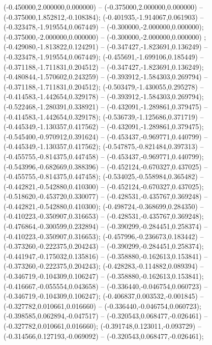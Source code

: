  (-0.450000,2.000000,0.000000) -- (-0.375000,2.000000,0.000000) -- (-0.375000,1.852812,-0.108384);
 (-0.401935,-1.914067,0.061903) -- (-0.323478,-1.919554,0.067449) -- (-0.300000,-2.000000,0.000000);
 (-0.375000,-2.000000,0.000000) -- (-0.300000,-2.000000,0.000000) ;
 (-0.429080,-1.813822,0.124291) -- (-0.347427,-1.823691,0.136249) -- (-0.323478,-1.919554,0.067449);
 (-0.455691,-1.699106,0.185449) -- (-0.371188,-1.711831,0.204512) -- (-0.347427,-1.823691,0.136249);
 (-0.480844,-1.570602,0.243259) -- (-0.393912,-1.584303,0.269794) -- (-0.371188,-1.711831,0.204512);
 (-0.503479,-1.430055,0.295278) -- (-0.414583,-1.442654,0.329178) -- (-0.393912,-1.584303,0.269794);
 (-0.522468,-1.280391,0.338921) -- (-0.432091,-1.289861,0.379475) -- (-0.414583,-1.442654,0.329178);
 (-0.536739,-1.125686,0.371719) -- (-0.445349,-1.130357,0.417562) -- (-0.432091,-1.289861,0.379475);
 (-0.545400,-0.970912,0.391624) -- (-0.453437,-0.969771,0.440799) -- (-0.445349,-1.130357,0.417562);
 (-0.547875,-0.821484,0.397313) -- (-0.455755,-0.814375,0.447458) -- (-0.453437,-0.969771,0.440799);
 (-0.543996,-0.682669,0.388396) -- (-0.452124,-0.670327,0.437025) -- (-0.455755,-0.814375,0.447458);
 (-0.534025,-0.558984,0.365482) -- (-0.442821,-0.542880,0.410300) -- (-0.452124,-0.670327,0.437025);
 (-0.518620,-0.453720,0.330077) -- (-0.428531,-0.435767,0.369248) -- (-0.442821,-0.542880,0.410300);
 (-0.498724,-0.368699,0.284350) -- (-0.410223,-0.350907,0.316653) -- (-0.428531,-0.435767,0.369248);
 (-0.476864,-0.300599,0.232894) -- (-0.390299,-0.284451,0.258374) -- (-0.410223,-0.350907,0.316653);
 (-0.457996,-0.236673,0.183442) -- (-0.373260,-0.222375,0.204243) -- (-0.390299,-0.284451,0.258374);
 (-0.441947,-0.175032,0.135816) -- (-0.358880,-0.162613,0.153841) -- (-0.373260,-0.222375,0.204243);
 (-0.428283,-0.114882,0.089394) -- (-0.346719,-0.104309,0.106247) -- (-0.358880,-0.162613,0.153841);
 (-0.416667,-0.055554,0.043658) -- (-0.336440,-0.046754,0.060723) -- (-0.346719,-0.104309,0.106247);
 (-0.406837,0.003532,-0.001845) -- (-0.327782,0.010661,0.016660) -- (-0.336440,-0.046754,0.060723);
 (-0.398585,0.062894,-0.047517) -- (-0.320543,0.068477,-0.026461) -- (-0.327782,0.010661,0.016660);
 (-0.391748,0.123011,-0.093729) -- (-0.314566,0.127193,-0.069092) -- (-0.320543,0.068477,-0.026461);
